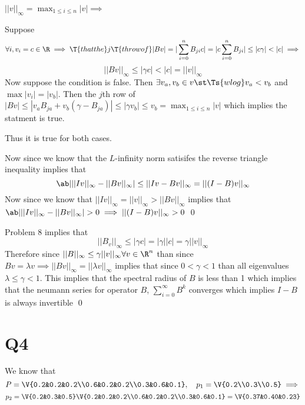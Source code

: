 \documentclass[12pt]{amsart}
\begin{document}
  \begin{problem}
    $||v||_\infty = \max_{1\leq i\leq n}|v| \implies$

    Suppose 
    \[\forall i,v_i =c\in\R\implies \T{ that the } j\T{th row of }|Bv| = |\sum_{i=0}^n B_{ji}c| = |c\sum_{i=0}^nB_{ji}| \leq |c\gamma| < |c| \implies\]
    \[||Bv||_\infty \leq |\gamma c|<|c|=||v||_\infty\]
    Now suppose the condition is false. Then $\exists v_a,v_b\in v \st \Ts{wlog} v_a < v_b$ and $\max|v_i|=|v_b|$. Then the $j$th row of $|Bv|\leq |v_aB_{ja} + v_b(\gamma - B_{ja})| \leq |\gamma v_b| \leq v_b = \max_{1\leq i\leq n}|v|$ which implies the statment is true. 
  
  Thus it is true for both cases. 
  \end{problem}

  \begin{problem}
    Now since we know that the $L$-infinity norm satisifes the reverse triangle inequality implies that
    \[\ab| ||Iv||_\infty -||Bv||_\infty | \leq ||Iv-Bv||_\infty = ||(I-B)v||_\infty\]
    Now since we know that $||Iv||_\infty = ||v||_\infty > ||Bv||_\infty$ implies that $\ab| ||Iv||_\infty -||Bv||_\infty | > 0 \implies ||(I-B)v||_\infty > 0$ \qed
  \end{problem}

  \begin{problem}
    Problem 8 implies that 
    \[||B_v||_\infty\leq |\gamma c| = |\gamma||c| = \gamma||v||_\infty\] 
    Therefore since $||B||_\infty \leq \gamma ||v||_\infty \forall v\in\R^n$ than since $Bv= \lambda v \implies ||Bv||_\infty = ||\lambda v||_\infty$ implies that since $0 < \gamma < 1$ than all eigenvalues $\lambda\leq \gamma < 1$. This implies that the spectral radius of $B$ is less than 1 which implies that the neumann series for operator $B$, $\sum_{i=0}^\infty B^k$ converges which implies $I-B$ is always invertible \qed 
  \end{problem}

  \section{Q4}
  \begin{problem}
    We know that
    \[P=\V{0.2&0.2&0.2\\0.6&0.2&0.2\\0.3&0.6&0.1},\quad p_1 = \V{0.2\\0.3\\0.5} \implies\]
    \[p_2 = \V{0.2&0.3&0.5}\V{0.2&0.2&0.2\\0.6&0.2&0.2\\0.3&0.6&0.1} = \V{0.37&0.40&0.23}\]
  \end{problem}
\end{document}
